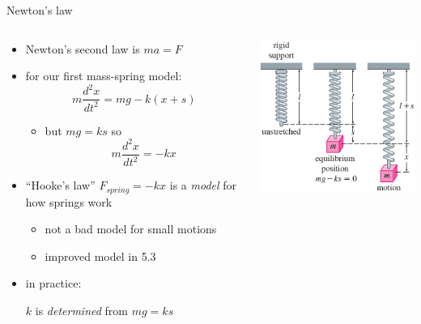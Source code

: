 \documentclass{beamer}
\begin{document}
\begin{frame}{Newton's law}

\begin{columns}
\begin{column}{0.65\textwidth}
\begin{itemize}
\item Newton's second law is $ma=F$
\item for our first mass-spring model:
        $$m \frac{d^2x}{dt^2} = mg - k (x+s)$$

\vspace{-3mm}
    \begin{itemize}
    \item but $mg=ks$ so
    $$\boxed{m \frac{d^2x}{dt^2} = - k x}$$
    \end{itemize}
\item ``Hooke's law'' $F_{spring} = -kx$ is a \emph{model} for how springs work
    \begin{itemize}
    \item not a bad model for small motions
    \item improved model in 5.3
    \end{itemize}
\item in practice:

\centerline{$k$ is \emph{determined} from $mg=ks$}
\end{itemize}
\end{column}
\begin{column}{0.35\textwidth}
\includegraphics[width=\textwidth]{figs/mass-spring-setup}
\end{column}
\end{columns}
\end{frame}
\end{document}
